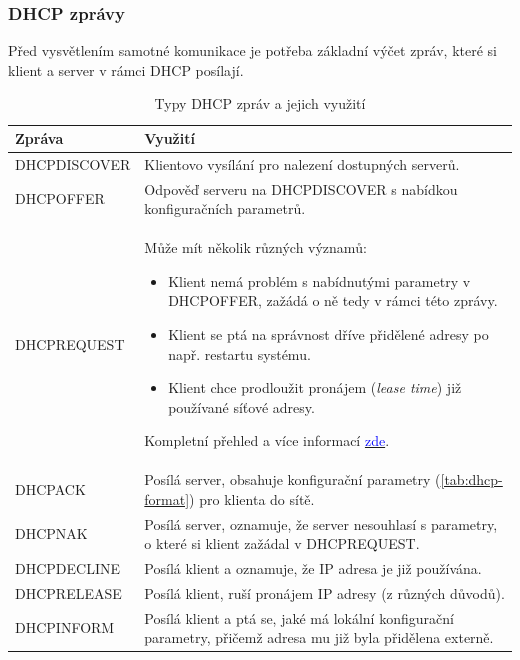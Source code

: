 \documentclass[a4paper, 11pt, hidelinks]{article}
\begin{document}
\subsubsection{DHCP zprávy}\label{1_2_1_zpravy}

Před vysvětlením samotné komunikace je potřeba základní výčet zpráv, které si klient a server v rámci DHCP posílají.

\begin{table}[h]
    \centering
    \begin{tabularx}{\textwidth}{lX}
        \toprule
        \textbf{Zpráva} & \textbf{Využití} \\
        \midrule
        DHCPDISCOVER & Klientovo vysílání pro nalezení dostupných serverů. \\
        DHCPOFFER & Odpověď serveru na DHCPDISCOVER s nabídkou konfiguračních parametrů. \\
        DHCPREQUEST & Může mít několik různých významů:
        \begin{itemize}
            \item Klient nemá problém s nabídnutými parametry v DHCPOFFER, zažádá o ně tedy v rámci této zprávy.
            \item Klient se ptá na správnost dříve přidělené adresy po např. restartu systému.
            \item Klient chce prodloužit pronájem (\emph{lease time}) již používané síťové adresy.
        \end{itemize}
        Kompletní přehled a více informací \href{https://www.freesoft.org/CIE/RFC/2131/24.html}{\textcolor{blue}{zde}}. \\
        DHCPACK & Posílá server, obsahuje konfigurační parametry (\ref{tab:dhcp-format}) pro klienta do sítě. \\
        DHCPNAK & Posílá server, oznamuje, že server nesouhlasí s parametry, o které si klient zažádal v DHCPREQUEST. \\
        DHCPDECLINE & Posílá klient a oznamuje, že IP adresa je již používána. \\
        DHCPRELEASE & Posílá klient, ruší pronájem IP adresy (z různých důvodů). \\
        DHCPINFORM & Posílá klient a ptá se, jaké má lokální konfigurační parametry, přičemž adresa mu již byla přidělena externě. \\
        \bottomrule
    \end{tabularx}
    \caption{Typy DHCP zpráv a jejich využití}
    \label{tab:dhcp_messages}
\end{table}
\end{document}
